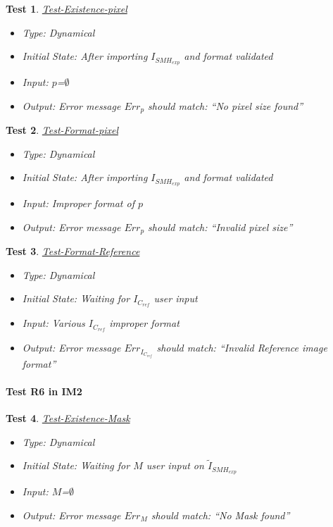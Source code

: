 \documentclass[12pt, titlepage]{article}
\newtheorem{Test}{Test}
\begin{document}
\begin{Test}\normalfont\underline{Test-Existence-pixel}
\begin{itemize}
\item Type: Dynamical
\item Initial State: After importing $I_{SMH_{exp}}$ and format validated
\item Input: $p$=$\emptyset$
\item Output: Error message $Err_{p}$ should match: \enquote{No pixel size found}
\end{itemize}
\end{Test}

\begin{Test}\normalfont\underline{Test-Format-pixel}
\begin{itemize}
\item Type: Dynamical
\item Initial State: After importing $I_{SMH_{exp}}$ and format validated
\item Input: Improper format of $p$
\item Output: Error message $Err_{p}$ should match: \enquote{Invalid pixel size}
\end{itemize}
\end{Test}


\begin{Test}\normalfont\underline{Test-Format-Reference}
\begin{itemize}
\item Type: Dynamical
\item Initial State: Waiting for $I_{C_{ref}}$ user input
\item Input: Various $I_{C_{ref}}$ improper format
\item Output: Error message $Err_{I_{C_{ref}}}$ should match: \enquote{Invalid Reference image format}
\end{itemize}
\end{Test}

\paragraph{Test R6 in IM2}

\begin{Test}\normalfont\underline{Test-Existence-Mask}
\begin{itemize}
\item Type: Dynamical
\item Initial State: Waiting for $M$ user input on $\widetilde{I}_{SMH_{exp}}$
\item Input: $M$=$\emptyset$
\item Output:  Error message $Err_{M}$ should match: \enquote{No Mask found}
\end{itemize}
\end{Test}
\end{document}
